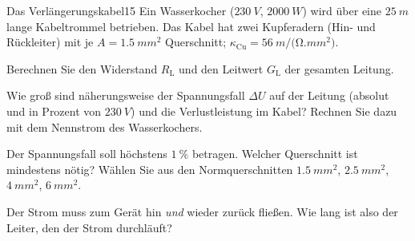 \documentclass[11pt,a4paper]{article}
\begin{document}

\begin{aufgabe}{Das Verlängerungskabel}{15}
Ein Wasserkocher ($\SI{230}{V}$, $\SI{2000}{W}$) wird über eine $\SI{25}{m}$ lange Kabeltrommel betrieben. Das Kabel hat zwei Kupferadern (Hin- und Rückleiter) mit je $A = \SI{1.5}{mm^2}$ Querschnitt; $\kappa_\text{Cu} = \SI{56}{m/(\ohm.mm^2)}$.
\begin{teilaufgaben}
  \item Berechnen Sie den Widerstand $R_\text{L}$ und den Leitwert $G_\text{L}$ der gesamten Leitung.
  \item Wie groß sind näherungsweise der Spannungsfall $\Delta U$ auf der Leitung (absolut und in Prozent von $\SI{230}{V}$) und die Verlustleistung im Kabel? Rechnen Sie dazu mit dem Nennstrom des Wasserkochers.
  \item Der Spannungsfall soll höchstens $\SI{1}{\percent}$ betragen. Welcher Querschnitt ist mindestens nötig? Wählen Sie aus den Normquerschnitten $\SI{1.5}{mm^2}$, $\SI{2.5}{mm^2}$, $\SI{4}{mm^2}$, $\SI{6}{mm^2}$.
\end{teilaufgaben}
\begin{tipp}Der Strom muss zum Gerät hin \emph{und} wieder zurück fließen. Wie lang ist also der Leiter, den der Strom durchläuft?\end{tipp}
\end{aufgabe}
\end{document}
